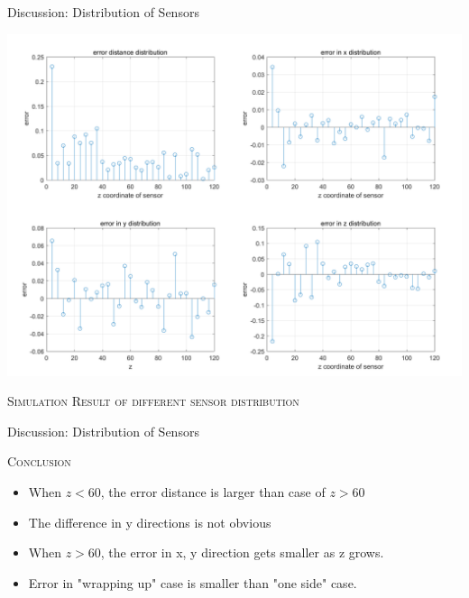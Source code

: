 \documentclass[10pt]{beamer}
\begin{document}
\begin{frame}{Discussion: Distribution of Sensors}
 \begin{center}
  \includegraphics[scale = 0.15]{img/error_vs_z.png}
  \end{center}
 \begin{center} \textsc{Simulation Result of different sensor distribution} \end{center}
\end{frame}

\begin{frame}{Discussion: Distribution of Sensors}
 \begin{center} \textsc{Conclusion} \end{center}
\begin{itemize}
\item When $z < 60$, the error distance is \alert{larger} than case of $z > 60$
\vfill
\item The difference in y directions is not obvious
\vfill
\item When $z > 60$, the error in x, y direction gets smaller as z grows. 
\vfill
\item Error in "wrapping up" case is \alert{smaller} than "one side" case. 
\end{itemize}
\end{frame}
\end{document}
